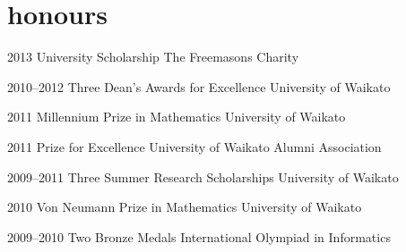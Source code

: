 \documentclass[]{boris-cv}
\begin{document}
\section{honours}
\begin{entrylist}
  \titleentry
    {2013}
    {University Scholarship}
    {The Freemasons Charity}

  \titleentry
    {2010--2012}
    {Three Dean's Awards for Excellence}
    {University of Waikato}

  \titleentry
    {2011}
    {Millennium Prize in Mathematics}
    {University of Waikato}

  \titleentry
    {2011}
    {Prize for Excellence}
    {University of Waikato Alumni Association}

  \titleentry
    {2009--2011}
    {Three Summer Research Scholarships}
    {University of Waikato}

  \titleentry
    {2010}
    {Von Neumann Prize in Mathematics}
    {University of Waikato}

  \titleentry
    {2009--2010}
    {Two Bronze Medals}
    {International Olympiad in Informatics}
\end{entrylist}
\end{document}
